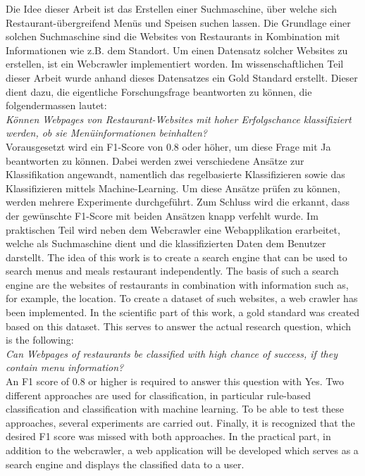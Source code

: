Die Idee dieser Arbeit ist das Erstellen einer Suchmaschine, über welche sich Restaurant-übergreifend Menüs und Speisen suchen lassen.
Die Grundlage einer solchen Suchmaschine sind die Websites von Restaurants in Kombination mit Informationen wie z.B. dem Standort.
Um einen Datensatz solcher Websites zu erstellen, ist ein Webcrawler implementiert worden.
Im wissenschaftlichen Teil dieser Arbeit wurde anhand dieses Datensatzes ein Gold Standard erstellt.
Dieser dient dazu, die eigentliche Forschungsfrage beantworten zu können, die folgendermassen lautet:\\
\emph{Können Webpages von Restaurant-Websites mit hoher Erfolgschance klassifiziert werden, ob sie Menüinformationen beinhalten?}\\
Vorausgesetzt wird ein F1-Score von 0.8 oder höher, um diese Frage mit \glqq Ja\grqq{} beantworten zu können.
Dabei werden zwei verschiedene Ansätze zur Klassifikation angewandt, namentlich das regelbasierte Klassifizieren sowie das Klassifizieren mittels Machine-Learning.
Um diese Ansätze prüfen zu können, werden mehrere Experimente durchgeführt.
Zum Schluss wird die erkannt, dass der gewünschte F1-Score mit beiden Ansätzen knapp verfehlt wurde.
Im praktischen Teil wird neben dem Webcrawler eine Webapplikation erarbeitet, welche als Suchmaschine dient und die klassifizierten Daten dem Benutzer darstellt.
The idea of this work is to create a search engine that can be used to search menus and meals restaurant independently.
The basis of such a search engine are the websites of restaurants in combination with information such as, for example, the location.
To create a dataset of such websites, a web crawler has been implemented.
In the scientific part of this work, a gold standard was created based on this dataset.
This serves to answer the actual research question, which is the following: \\
\emph{Can Webpages of restaurants be classified with high chance of success, if they contain menu information?} \\
An F1 score of 0.8 or higher is required to answer this question with \glqq Yes\grqq{}.
Two different approaches are used for classification, in particular rule-based classification and classification with machine learning.
To be able to test these approaches, several experiments are carried out.
Finally, it is recognized that the desired F1 score was missed with both approaches.
In the practical part, in addition to the webcrawler, a web application will be developed which serves as a search engine and displays the classified data to a user.